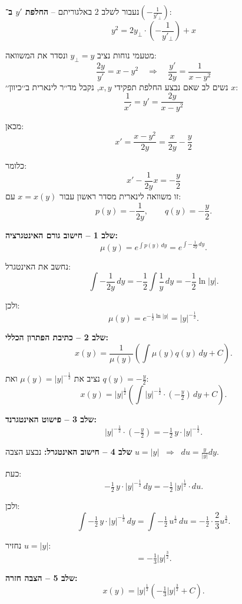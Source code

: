 \documentclass{article}
\numberwithin{equation}{section}
\begin{document}
נעבור לשלב 2 באלגוריתם – \textbf{החלפת $y'$ ב־$\left(-\tfrac{1}{y'_\perp}\right)$}:
\[
y^2 = 2y_\perp \cdot \left(-\frac{1}{y'_\perp}\right) + x
\]

מטעמי נוחות נציב $y_{\perp}=y$ ונסדר את המשוואה:
\[
\frac{2y}{y'} = x - y^2 
\quad \Longrightarrow \quad 
\frac{y'}{2y} = \frac{1}{x - y^2} 
\]
נשים לב שאם נבצע החלפת תפקידי $x,y$, נקבל מד׳׳ר לינארית ב׳׳כיוון׳׳ $x$:
\[ 
\frac{1}{x'} = y' = \frac{2y}{x - y^2}
\]

מכאן:
\[
x' = \frac{x - y^2}{2y} = \frac{x}{2y} - \frac{y}{2}
\]

כלומר:
\[
x' - \frac{1}{2y}x = -\frac{y}{2}
\]
זו משוואה לינארית מסדר ראשון עבור $x=x(y)$ עם:
\[
p(y) = -\frac{1}{2y}, 
\qquad 
q(y) = -\frac{y}{2}.
\]

\textbf{שלב 1 – חישוב גורם האינטגרציה:}
\[
\mu(y) = e^{\int p(y)\,dy} 
= e^{\int -\tfrac{1}{2y}\,dy}.
\]

נחשב את האינטגרל:
\[
\int -\frac{1}{2y}\,dy = -\frac{1}{2}\int \frac{1}{y}\,dy 
= -\frac{1}{2}\ln|y|.
\]

ולכן:
\[
\mu(y) = e^{-\tfrac{1}{2}\ln|y|} = |y|^{-\tfrac{1}{2}}.
\]

\textbf{שלב 2 – כתיבת הפתרון הכללי:}
\[
x(y) = \frac{1}{\mu(y)}\left(\int \mu(y)q(y)\,dy + C\right).
\]

נציב את $\mu(y)=|y|^{-\tfrac{1}{2}}$ ואת $q(y)=-\tfrac{y}{2}$:
\[
x(y) = |y|^{\tfrac{1}{2}}\left(\int |y|^{-\tfrac{1}{2}}\cdot\left(-\tfrac{y}{2}\right)\,dy + C\right).
\]

\textbf{שלב 3 – פישוט האינטגרנד:}
\[
|y|^{-\tfrac{1}{2}}\cdot\left(-\tfrac{y}{2}\right) 
= -\tfrac{1}{2}\,y\cdot |y|^{-\tfrac{1}{2}}.
\]

\textbf{שלב 4 – חישוב האינטגרל:}  
נבצע הצבה $u=|y| \;\;\Rightarrow\;\; du = \tfrac{y}{|y|}dy$.  

כעת:
\[
-\tfrac{1}{2}\,y\cdot |y|^{-\tfrac{1}{2}}\,dy
= -\tfrac{1}{2}\,|y|^{\tfrac{1}{2}}\cdot du.
\]

ולכן:
\[
\int -\tfrac{1}{2}\,y\cdot |y|^{-\tfrac{1}{2}}\,dy
= \int -\tfrac{1}{2}\,u^{\tfrac{1}{2}}\,du
= -\tfrac{1}{2}\cdot \frac{2}{3}u^{\tfrac{3}{2}}.
\]

נחזיר $u=|y|$:
\[
= -\tfrac{1}{3}|y|^{\tfrac{3}{2}}.
\]

\textbf{שלב 5 – הצבה חזרה:}
\[
x(y) = |y|^{\tfrac{1}{2}}\left(-\tfrac{1}{3}|y|^{\tfrac{3}{2}} + C\right).
\]
\end{document}
